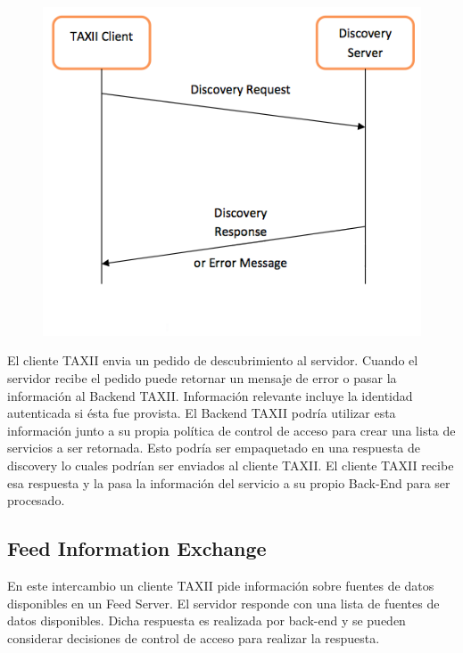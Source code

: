 \begin{figure}[ht!]
  \centering
    \includegraphics[width=150mm]{./Figures/DiscoveryExchange.png}
\end{figure}

El cliente TAXII envia un pedido de descubrimiento al servidor. Cuando el 
servidor recibe el pedido puede retornar un mensaje de error o pasar la 
información al Backend TAXII. Información relevante incluye la identidad 
autenticada si ésta fue provista. El Backend TAXII podría utilizar esta 
información junto a su propia política de control de acceso  para crear una 
lista de servicios a ser retornada. Esto podría ser empaquetado en una 
respuesta de discovery lo cuales podrían ser enviados al cliente TAXII. El 
cliente TAXII recibe esa respuesta y la pasa la información del servicio a su 
propio Back-End para ser procesado.

\subsection{Feed Information Exchange}

En este intercambio un cliente TAXII pide información sobre fuentes de datos disponibles en 
un Feed Server. El servidor responde con una lista de fuentes de datos 
disponibles. Dicha respuesta es realizada por back-end y se pueden considerar 
decisiones de control de acceso para realizar la respuesta.

